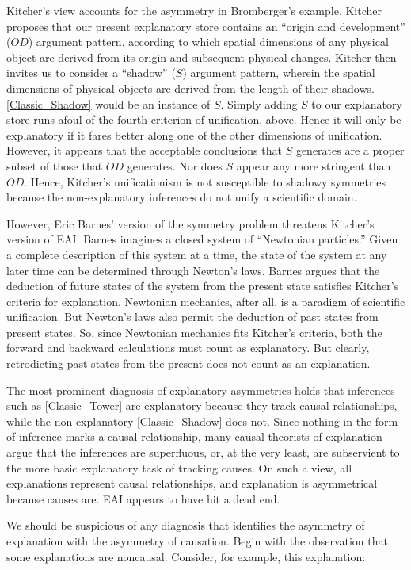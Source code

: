 \documentclass[natbib]{svjour3}                     %
\begin{document}
Kitcher's view accounts for the asymmetry in Bromberger's example. Kitcher proposes that our present explanatory store contains an ``origin and development'' ($OD$) argument pattern, according to which spatial dimensions of any physical object are derived from its origin and subsequent physical changes. Kitcher then invites us to consider a ``shadow'' ($S$) argument pattern, wherein the spatial dimensions of physical objects are derived from the length of their shadows. \ref{Classic_Shadow} would be an instance of $S$. Simply adding $S$ to our explanatory store runs afoul of the fourth criterion of unification, above. Hence it will only be explanatory if it fares better along one of the other dimensions of unification. However, it appears that the acceptable conclusions that $S$ generates are a proper subset of those that $OD$ generates. Nor does $S$ appear any more stringent than $OD$. Hence, Kitcher's unificationism is not susceptible to shadowy symmetries because the non-explanatory inferences do not unify a scientific domain.  

However, Eric Barnes' \cite{Barnes1992} version of the symmetry problem threatens Kitcher's version of EAI.  Barnes imagines a closed system of ``Newtonian particles.''  Given a complete description of this system at a time, the state of the system at any later time can be determined through Newton's laws.  Barnes argues that the deduction of future states of the system from the present state satisfies Kitcher's criteria for explanation.  Newtonian mechanics, after all, is a paradigm of scientific unification.  But Newton's laws also permit the deduction of past states from present states. So, since Newtonian mechanics fits Kitcher's criteria, both the forward and backward calculations must count as explanatory.  But clearly, retrodicting past states from the present does not count as an explanation.

The most prominent diagnosis of explanatory asymmetries holds that inferences such as \ref{Classic_Tower} are explanatory because they track causal relationships, while the non-explanatory \ref{Classic_Shadow} does not. Since nothing in the form of inference marks a causal relationship, many causal theorists of explanation argue that the inferences are superfluous, or, at the very least, are subservient to the more basic explanatory task of tracking causes. On such a view, all explanations represent causal relationships, and explanation is asymmetrical because causes are. EAI appears to have hit a dead end. 

We should be suspicious of any diagnosis that identifies the asymmetry of explanation with the asymmetry of causation. Begin with the observation that some explanations are noncausal. Consider, for example, this explanation: 
\end{document}
